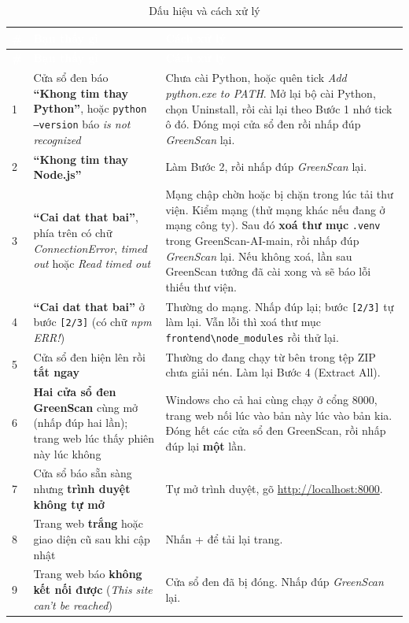 \documentclass[12pt,a4paper,oneside]{report}
\newcommand{\thd}[1]{\textcolor{white}{\bfseries #1}}
\newcommand{\hdr}{\rowcolor{gsteal}}
\newcommand{\bangchu}{\small\linespread{1.1}\selectfont}
\newcommand{\tep}[1]{\nolinkurl{#1}}
\newcommand{\nut}[1]{{\setlength{\fboxsep}{1.6pt}\colorbox{boxbg}{\headfont\small #1}}}
\newcommand{\phim}[1]{{\setlength{\fboxsep}{1.2pt}\fbox{\headfont\footnotesize #1}}}
\begin{document}
\begingroup\bangchu
\begin{xltabular}{\linewidth}{L{0.5cm}L{4.3cm}Y}
\caption{Dấu hiệu và cách xử lý}\label{tab:loi}\\
\hdr \thd{\#} & \thd{Bạn thấy gì} & \thd{Cách xử lý} \\
\endfirsthead
\hdr \thd{\#} & \thd{Bạn thấy gì} & \thd{Cách xử lý} \\
 & Cửa sổ đen báo \textbf{``Khong tim thay Python''}, hoặc \texttt{python --version} báo \emph{is not recognized} & Chưa cài Python, hoặc quên tick \emph{Add python.exe to PATH}. Mở lại bộ cài Python, chọn \nut{Uninstall}, rồi cài lại theo Bước 1 nhớ tick ô đó. Đóng mọi cửa sổ đen rồi nhấp đúp \emph{GreenScan} lại. \\
2 & \textbf{``Khong tim thay Node.js''} & Làm Bước 2, rồi nhấp đúp \emph{GreenScan} lại. \\
3 & \textbf{``Cai dat that bai''}, phía trên có chữ \emph{ConnectionError}, \emph{timed out} hoặc \emph{Read timed out} & Mạng chập chờn hoặc bị chặn trong lúc tải thư viện. Kiểm mạng (thử mạng khác nếu đang ở mạng công ty). Sau đó \textbf{xoá thư mục} \tep{.venv} trong GreenScan-AI-main, rồi nhấp đúp \emph{GreenScan} lại. Nếu không xoá, lần sau GreenScan tưởng đã cài xong và sẽ báo lỗi thiếu thư viện. \\
4 & \textbf{``Cai dat that bai''} ở bước \texttt{[2/3]} (có chữ \emph{npm ERR!}) & Thường do mạng. Nhấp đúp lại; bước \texttt{[2/3]} tự làm lại. Vẫn lỗi thì xoá thư mục \texttt{frontend\textbackslash node\_modules} rồi thử lại. \\
5 & Cửa sổ đen hiện lên rồi \textbf{tắt ngay} & Thường do đang chạy từ bên trong tệp ZIP chưa giải nén. Làm lại Bước 4 (Extract All). \\
6 & \textbf{Hai cửa sổ đen GreenScan} cùng mở (nhấp đúp hai lần); trang web lúc thấy phiên này lúc không & Windows cho cả hai cùng chạy ở cổng 8000, trang web nối lúc vào bản này lúc vào bản kia. Đóng hết các cửa sổ đen GreenScan, rồi nhấp đúp lại \textbf{một} lần. \\
7 & Cửa sổ báo sẵn sàng nhưng \textbf{trình duyệt không tự mở} & Tự mở trình duyệt, gõ \url{http://localhost:8000}. \\
8 & Trang web \textbf{trắng} hoặc giao diện cũ sau khi cập nhật & Nhấn \phim{Ctrl}+\phim{F5} để tải lại trang. \\
9 & Trang web báo \textbf{không kết nối được} (\emph{This site can't be reached}) & Cửa sổ đen đã bị đóng. Nhấp đúp \emph{GreenScan} lại. \\

\end{xltabular}
\end{document}
